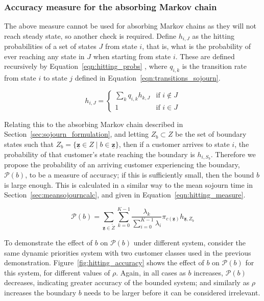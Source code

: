 \documentclass{article}
\begin{document}
\subsubsection{Accuracy measure for the absorbing Markov chain}\label{sec:absorbing_accuracy}
The above measure cannot be used for absorbing Markov chains as they will not
reach steady state, so another check is required. Define $h_{i,J}$ as the
hitting probabilities of a set of states $J$ from state $i$, that is, what is
the probability of ever reaching any state in $J$ when starting from state $i$.
These are defined recursively by Equation~\ref{eqn:hitting_probs}
\cite{privault13}, where $q_{i,k}$ is the transition rate from state $i$ to
state $j$ defined in Equation~\ref{eqn:transitions_sojourn}.

\begin{equation}\label{eqn:hitting_probs}
h_{i,J} = \begin{cases}
\sum_k q_{i,k} h_{k,J} & \text{if } i \notin J \\
1 & \text{if } i \in J
\end{cases}
\end{equation}

Relating this to the absorbing Markov chain described in
Section~\ref{sec:sojourn_formulation}, and letting $Z_b \subset Z$ be the set of
boundary states such that
$Z_b = \{\underline{\mathbf{z}} \in Z \; | \; b \in \underline{\mathbf{z}}\}$,
then if a customer arrives to state $i$, the probability of that customer's
state reaching the boundary is $h_{i,S_b}$. Therefore we propose the probability
of an arriving customer experiencing the boundary, $\mathcal{P}(b)$, to be a
measure of accuracy; if this is sufficiently small, then the bound $b$ is large
enough. This is calculated in a similar way to the mean sojourn time in
Section~\ref{sec:meansojourncalc}, and given in Equation~\ref{eqn:hitting_measure}.

\begin{equation}\label{eqn:hitting_measure}
\mathcal{P}(b) = \sum_{\underline{\mathbf{z}} \in \tilde{Z}} \sum_{k=0}^{K-1} \frac{\lambda_k}{\sum_{i=0}^{K-1} \lambda_i} \pi_{c(\underline{\mathbf{z}})} h_{\underline{\mathbf{z}}, Z_b}
\end{equation}

To demonstrate the effect of $b$ on $\mathcal{P}(b)$ under different system,
consider the same dynamic priorities system with two customer classes used in
the previous demonstration. Figure~\ref{fig:hitting_accuracy} shows the effect
of $b$ on $\mathcal{P}(b)$ for this system, for different values of $\rho$.
Again, in all cases as $b$ increases, $\mathcal{P}(b)$ decreases, indicating
greater accuracy of the bounded system; and similarly as $\rho$ increases the
boundary $b$ needs to be larger before it can be considered irrelevant.
\end{document}
